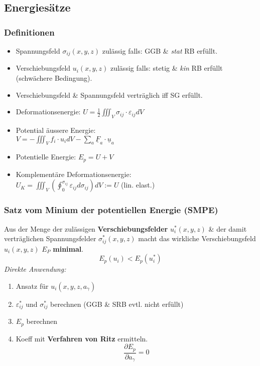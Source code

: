     \subsection{Energiesätze}
        \subsubsection{Definitionen}
            \begin{itemize}
                \item Spannungsfeld $\sigma_{ij}(x,y,z)$ zulässig falls: GGB \& \textit{stat} RB erfüllt.
                \item Verschiebungsfeld $u_i(x,y,z)$ zulässig falls: stetig \& \textit{kin} RB erfüllt (schwächere Bedingung).
                \item Verschiebungsfeld \& Spannungsfeld verträglich iff SG erfüllt.
                \item Deformationsenergie: $U=\frac{1}{2}\iiint_V \sigma_{ij}\cdot\varepsilon_{ij}dV$
                \item Potential äussere Energie:\\
                $V=-\iiint_V f_i\cdot u_idV-\sum_{a}\underline{F}_a\cdot\underline{u}_a$
                \item Potentielle Energie: $E_p=U+V$
                \item Komplementäre Deformationsenergie:\\ $U_K=\iiint_V(\oint_0^{\sigma_{ij}}\varepsilon_{ij}d\sigma_{ij})dV := U$  (lin. elast.)
            \end{itemize}
        \vspace{2mm}
        \subsubsection{Satz vom Minium der potentiellen Energie (SMPE)}
            Aus der Menge der zulässigen \textbf{Verschiebungsfelder} $u_i^*(x,y,z)$ \& der damit verträglichen Spannungsfelder $\sigma_{ij}^*(x,y,z)$ macht das wirkliche Verschiebungsfeld $u_i(x,y,z)$ $E_P$ \textbf{minimal}.
            \[E_p(u_i) < E_p(u_i^*)\]
            \textit{Direkte Anwendung:}
            \begin{enumerate}
                \item Ansatz für $u_i(x,y,z,a_{\gamma})$
                \item $\varepsilon_{ij}^*$ und $\sigma_{ij}^*$ berechnen (GGB \& SRB evtl. nicht erfüllt)
                \item $E_p$ berechnen
                \item Koeff mit \textbf{Verfahren von Ritz} ermitteln.
                \[\frac{\partial E_p}{\partial a_{\gamma}} =0\]
            \end{enumerate}
            

